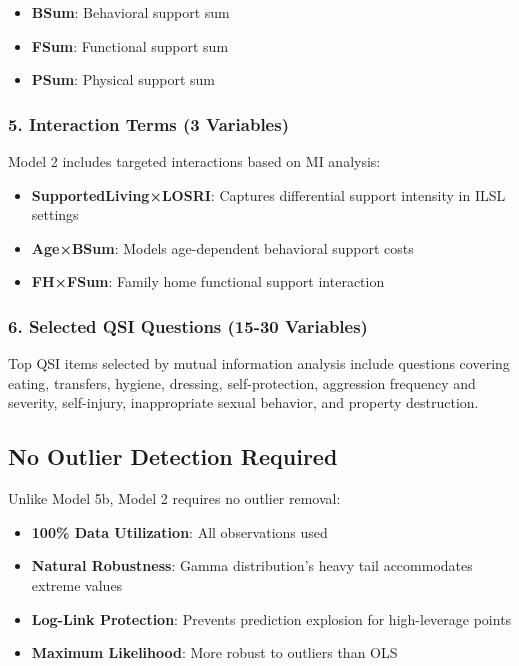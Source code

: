 \begin{itemize}
    \item \textbf{BSum}: Behavioral support sum
    \item \textbf{FSum}: Functional support sum
    \item \textbf{PSum}: Physical support sum
\end{itemize}

\subsubsection{5. Interaction Terms (3 Variables)}

Model 2 includes targeted interactions based on MI analysis:

\begin{itemize}
    \item \textbf{SupportedLiving×LOSRI}: Captures differential support intensity in ILSL settings
    \item \textbf{Age×BSum}: Models age-dependent behavioral support costs
    \item \textbf{FH×FSum}: Family home functional support interaction
\end{itemize}

\subsubsection{6. Selected QSI Questions (15-30 Variables)}

Top QSI items selected by mutual information analysis include questions covering eating, transfers, hygiene, dressing, self-protection, aggression frequency and severity, self-injury, inappropriate sexual behavior, and property destruction.

\subsection{No Outlier Detection Required}

Unlike Model 5b, Model 2 requires no outlier removal:

\begin{itemize}
    \item \textbf{100\% Data Utilization}: All observations used
    \item \textbf{Natural Robustness}: Gamma distribution's heavy tail accommodates extreme values
    \item \textbf{Log-Link Protection}: Prevents prediction explosion for high-leverage points
    \item \textbf{Maximum Likelihood}: More robust to outliers than OLS
\end{itemize}

